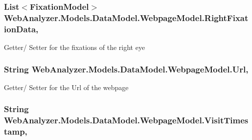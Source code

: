 \subsubsection[{Right\+Fixation\+Data}]{\setlength{\rightskip}{0pt plus 5cm}List$<${\bf Fixation\+Model}$>$ Web\+Analyzer.\+Models.\+Data\+Model.\+Webpage\+Model.\+Right\+Fixation\+Data\hspace{0.3cm}{\ttfamily [get]}, {\ttfamily [set]}}\label{class_web_analyzer_1_1_models_1_1_data_model_1_1_webpage_model_abe8cc7ad2f30655dbd1ba0c1111429d6}


Getter/ Setter for the fixations of the right eye 

\hypertarget{class_web_analyzer_1_1_models_1_1_data_model_1_1_webpage_model_a956b067ed12f422f646b7e2a4b6bb42d}{}
\subsubsection[{Url}]{\setlength{\rightskip}{0pt plus 5cm}String Web\+Analyzer.\+Models.\+Data\+Model.\+Webpage\+Model.\+Url\hspace{0.3cm}{\ttfamily [get]}, {\ttfamily [set]}}\label{class_web_analyzer_1_1_models_1_1_data_model_1_1_webpage_model_a956b067ed12f422f646b7e2a4b6bb42d}


Getter/ Setter for the Url of the webpage 

\hypertarget{class_web_analyzer_1_1_models_1_1_data_model_1_1_webpage_model_ac3378fdc78273706547ec3a9d377ef9a}{}
\subsubsection[{Visit\+Timestamp}]{\setlength{\rightskip}{0pt plus 5cm}String Web\+Analyzer.\+Models.\+Data\+Model.\+Webpage\+Model.\+Visit\+Timestamp\hspace{0.3cm}{\ttfamily [get]}, {\ttfamily [set]}}\label{class_web_analyzer_1_1_models_1_1_data_model_1_1_webpage_model_ac3378fdc78273706547ec3a9d377ef9a}


